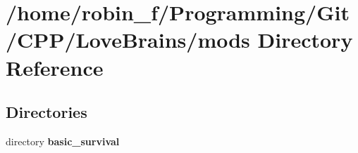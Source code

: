 \section{/home/robin\+\_\+f/\+Programming/\+Git/\+C\+P\+P/\+Love\+Brains/mods Directory Reference}
\label{dir_d5e54c03ccf18aed6ac8def79f04e8c7}
\subsection*{Directories}
\begin{DoxyCompactItemize}
\item 
directory {\bf basic\+\_\+survival}
\end{DoxyCompactItemize}
